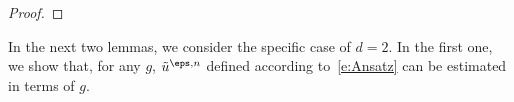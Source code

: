 \documentclass[reqno,11pt]{preprint}
\newcommand{\cA}{\mathcal{A}}
\newcommand{\cH}{\mathcal{H}}
\newcommand{\cL}{\mathcal{L}}
\newcommand{\1}{\mathds{1}}
\newcommand{\genap}{\cA^{\eps}_+}
\begin{document}
\begin{proof}
\end{proof}

In the next two lemmas, we consider the specific case of $d=2$. 
In the first one, we show that, for any $g$, $\tilde u^{\eps,n}$ defined according to~\eqref{e:Ansatz} 
can be estimated in terms of $g$. 
\end{document}
